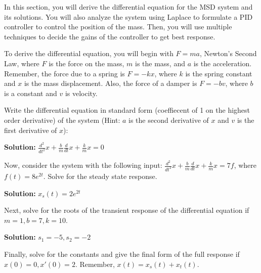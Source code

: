 \documentclass[12pt]{article}
\newenvironment{solution}{\vspace{2mm}\color{blue}\textbf{Solution: }}{\color{black}}
\begin{document}
\begin{enumerate}[\qquad 1)]

In this section, you will derive the differential equation for the MSD system and its solutions. You will also analyze the system using Laplace to formulate a PID controller to control the position of the mass. Then, you will use multiple techniques to decide the gains of the controller to get best response.


To derive the differential equation, you will begin with $F = ma$, Newton's Second Law, where $F$ is the force on the mass, $m$ is the mass, and $a$ is the acceleration. Remember, the force due to a spring is $F = -kx$, where $k$ is the spring constant and $x$ is the mass displacement. Also, the force of a damper is $F = -bv$, where $b$ is a constant and $v$ is velocity. 

Write the differential equation in standard form (coeffiecent of 1 on the highest order derivative) of the system (Hint: $a$ is the second derivative of $x$ and $v$ is the first derivative of $x$):

    \begin{solution}
        $\frac{d^2}{dt^2}x + \frac{b}{m}\frac{d}{dt}x + \frac{k}{m}x = 0$
    \end{solution}

Now, consider the system with the following input: $\frac{d^2}{dt^2}x + \frac{b}{m}\frac{d}{dt}x + \frac{k}{m}x = 7f$, where $f(t) = 8e^{2t}$. Solve for the steady state response.


    \begin{solution}
        $x_s(t) = 2e^{2t}$
    \end{solution}

    
Next, solve for the roots of the transient response of the differential equation if $m = 1, b = 7, k = 10$.

    \begin{solution}
    $s_1 = -5, s_2 = -2$
    \end{solution}


Finally, solve for the constants and give the final form of the full response if $x(0) = 0, x'(0) = 2$. Remember, $x(t) = x_s(t) + x_t(t)$.


\end{enumerate}
\end{document}

